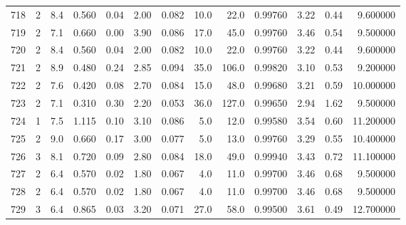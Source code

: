 \begin{tabular}{lrrrrrrrrrrrr}
718  &        2 &            8.4 &             0.560 &         0.04 &            2.00 &      0.082 &                 10.0 &                  22.0 &  0.99760 &  3.22 &       0.44 &   9.600000 \\
719  &        2 &            7.1 &             0.660 &         0.00 &            3.90 &      0.086 &                 17.0 &                  45.0 &  0.99760 &  3.46 &       0.54 &   9.500000 \\
720  &        2 &            8.4 &             0.560 &         0.04 &            2.00 &      0.082 &                 10.0 &                  22.0 &  0.99760 &  3.22 &       0.44 &   9.600000 \\
721  &        2 &            8.9 &             0.480 &         0.24 &            2.85 &      0.094 &                 35.0 &                 106.0 &  0.99820 &  3.10 &       0.53 &   9.200000 \\
722  &        2 &            7.6 &             0.420 &         0.08 &            2.70 &      0.084 &                 15.0 &                  48.0 &  0.99680 &  3.21 &       0.59 &  10.000000 \\
723  &        2 &            7.1 &             0.310 &         0.30 &            2.20 &      0.053 &                 36.0 &                 127.0 &  0.99650 &  2.94 &       1.62 &   9.500000 \\
724  &        1 &            7.5 &             1.115 &         0.10 &            3.10 &      0.086 &                  5.0 &                  12.0 &  0.99580 &  3.54 &       0.60 &  11.200000 \\
725  &        2 &            9.0 &             0.660 &         0.17 &            3.00 &      0.077 &                  5.0 &                  13.0 &  0.99760 &  3.29 &       0.55 &  10.400000 \\
726  &        3 &            8.1 &             0.720 &         0.09 &            2.80 &      0.084 &                 18.0 &                  49.0 &  0.99940 &  3.43 &       0.72 &  11.100000 \\
727  &        2 &            6.4 &             0.570 &         0.02 &            1.80 &      0.067 &                  4.0 &                  11.0 &  0.99700 &  3.46 &       0.68 &   9.500000 \\
728  &        2 &            6.4 &             0.570 &         0.02 &            1.80 &      0.067 &                  4.0 &                  11.0 &  0.99700 &  3.46 &       0.68 &   9.500000 \\
729  &        3 &            6.4 &             0.865 &         0.03 &            3.20 &      0.071 &                 27.0 &                  58.0 &  0.99500 &  3.61 &       0.49 &  12.700000 \\

\end{tabular}
